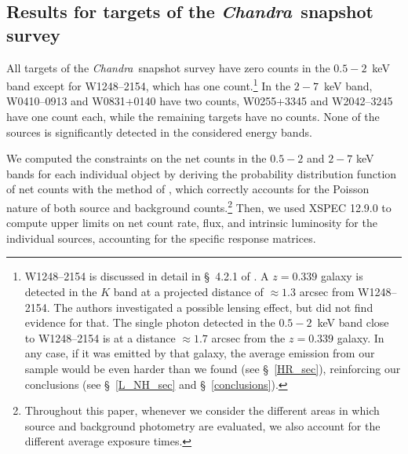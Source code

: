 \documentclass[useAMS,usenatbib]{mnras}
\newcommand*{\chandra}{\textit{Chandra}}
\begin{document}
\subsection{Results for targets of the \chandra\, snapshot survey }\label{det_snap}
All targets of the \chandra\, snapshot survey have zero counts in the $0.5-2$~keV band except for  W1248--2154, which has one count.\footnote{W1248--2154 is discussed in detail in \S~4.2.1 of \cite{Tsai15}. A $z=0.339$ galaxy is detected in the $K$ band at a projected distance of $\approx1.3$ arcsec from W1248--2154. The authors investigated a possible lensing effect, but did not find evidence for that. The single photon detected in the $0.5-2$~keV band close to W1248--2154 is at a distance $\approx1.7$ arcsec from the $z=0.339$ galaxy. In any case, if it was emitted by that galaxy, the  average emission from our sample would be even harder than we found (see \S~\ref{HR_sec}), reinforcing our conclusions (see \S~\ref{L_NH_sec} and \S~\ref{conclusions}).} In the \mbox{$2-7$ keV} band, W0410--0913 and W0831+0140 have two counts, W0255+3345 and W2042--3245 have one count each, while the remaining targets have no counts. 
None of the sources is significantly detected in the considered energy bands.




We computed the constraints on the net counts in the $0.5-2$ and $2-7$ keV bands for each individual object by deriving the probability distribution function of net counts with the method of \citet[see their Appendix A3]{Weisskopf07}, which correctly accounts for the Poisson nature of both source and background counts.\footnote{Throughout this paper, whenever we consider the different areas in which source and background photometry are evaluated, we also account for the different average exposure times.} 
Then, we used XSPEC 12.9.0 \citep{Arnaud96} to compute upper limits on net count rate, flux, and intrinsic luminosity for the individual sources, accounting for the specific response matrices.
 
\end{document}
